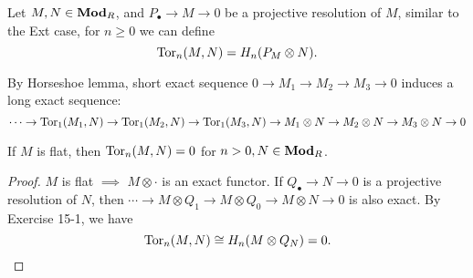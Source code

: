 \begin{definition}
  Let $M, N \in \mathbf{Mod}_R$, and $P_\bullet \to M \to 0$ be a projective resolution of $M$, 
  similar to the Ext case, for $n \ge 0$ we can define
  $$\operatorname{Tor}_n(M, N) = H_n(P_M \otimes N).$$
\end{definition}

\begin{fact}
  By Horseshoe lemma, short exact sequence $0 \to M_1 \to M_2 \to M_3 \to 0$
  induces a long exact sequence:
  $$\cdots \to \operatorname{Tor}_1(M_1, N) \to \operatorname{Tor}_1(M_2, N) \to \operatorname{Tor}_1(M_3, N) \to 
  M_1 \otimes N \to M_2 \otimes N \to M_3 \otimes N \to 0$$
\end{fact}

\begin{prop}
  If $M$ is flat, then $\operatorname{Tor}_n(M, N) = 0$ for $n > 0, N \in \mathbf{Mod}_R$.
  \begin{proof}
    $M$ is flat $\implies$ $M \otimes \cdot$ is an exact functor. If
    $Q_\bullet \to N \to 0$ is a projective resolution of $N$, then
    $\dotsm \to M \otimes Q_1 \to M\otimes Q_0 \to M\otimes N \to 0$ is also
    exact. By Exercise 15-1, we have
    \[
      \operatorname{Tor}_n(M, N) \cong H_n(M\otimes Q_N) = 0. \qedhere
    \]
  \end{proof}
\end{prop}

